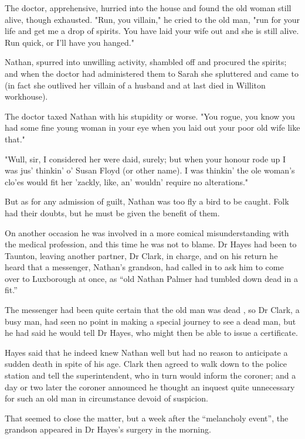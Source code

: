 The doctor, apprehensive, hurried into the house and found the old woman still alive, though exhausted. "Run, you villain," he cried to the old man, "run for your life and get me a drop of spirits. You have laid your wife out and she is still alive. Run quick, or I'll have you hanged."

Nathan, spurred into unwilling activity, shambled off and procured the spirits; and when the doctor had administered them to Sarah she spluttered and came to (in fact she outlived her villain of a husband and at last died in Williton workhouse).

The doctor taxed Nathan with his stupidity or worse. "You rogue, you know you had some fine young woman in your eye when you laid out your poor old wife like that."

"Wull, sir, I considered her were daid, surely; but when your honour rode up I was jus' thinkin' o' Susan Floyd (or other name). I was thinkin' the ole woman's clo'es would fit her 'zackly, like, an' wouldn' require no alterations."

But as for any admission of guilt, Nathan was too fly a bird to be caught. Folk had their doubts, but he must be given the benefit of them.

On another occasion he was involved in a more comical misunderstanding with the medical profession, and this time he was not to blame. Dr Hayes had been to Taunton, leaving another partner, Dr Clark, in charge, and on his return he heard that a messenger, Nathan’s grandson, had called in to ask him to come over to Luxborough at once, as “old Nathan Palmer had tumbled down dead in a fit.”

The messenger had been quite certain that the old man was dead , so Dr Clark, a busy man, had seen no point in making a special journey to see a dead man, but he had said he would tell Dr Hayes, who might then be able to issue a certificate.

Hayes said that he indeed knew Nathan well but had no reason to anticipate a sudden death in spite of his age. Clark then agreed to walk down to the police station and tell the superintendent, who in turn would inform the coroner; and a day or two later the coroner announced he thought an inquest quite unnecessary for such an old man in circumstance devoid of suspicion.

That seemed to close the matter, but a week after the “melancholy event”, the grandson appeared in Dr Hayes’s surgery in the morning.

